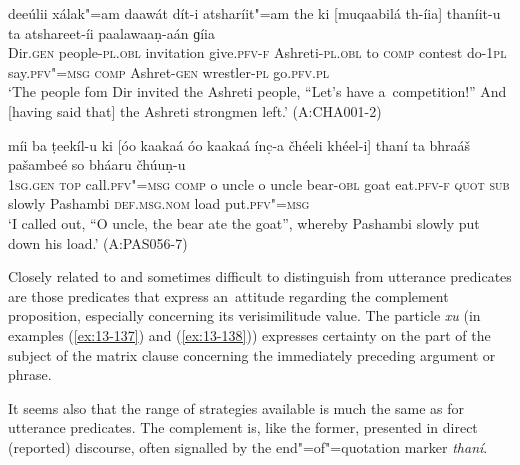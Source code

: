 \begin{exe}
\ex
\label{ex:13-135}
\gll deeúlii xálak"=am daawát dít-i  atsharíit"=am the ki [muqaabilá
  th-íia]  thaníit-u ta atshareet-íi paalawaaṇ-aán ɡíia \\
Dir.\textsc{gen} people-\textsc{pl.obl} invitation give.\textsc{pfv-f}  Ashreti-\textsc{pl.obl} to \textsc{comp} contest do-\textsc{1pl}  say.\textsc{pfv"=msg} \textsc{comp} Ashret-\textsc{gen} wrestler-\textsc{pl} go.\textsc{pfv.pl} \\
\glt `The people fom Dir invited the Ashreti people, ``Let's have a~competition!'' And [having said that] the Ashreti strongmen left.' (A:CHA001-2)

\ex
\label{ex:13-136}
\gll míi ba ṭeekíl-u ki [óo kaakaá óo kaakaá ínc̣-a čhéeli  khéel-i]
thaní ta bhraáš pašambeé so  bháaru čhúuṇ-u \\
\textsc{1sg.gen} \textsc{top} call.\textsc{pfv"=msg} \textsc{comp} o uncle o uncle bear-\textsc{obl} goat  eat.\textsc{pfv-f} \textsc{quot } \textsc{sub} slowly Pashambi \textsc{def.msg.nom} load put.\textsc{pfv"=msg}  \\
\glt `I called out, ``O uncle, the bear ate the goat'', whereby Pashambi slowly put down his load.' (A:PAS056-7) 
\end{exe}

 Closely related to and sometimes difficult to distinguish from utterance predicates are those predicates that express an~attitude regarding the complement proposition, especially concerning its verisimilitude value. The particle \textit{xu} (in examples (\ref{ex:13-137}) and (\ref{ex:13-138})) expresses certainty on the part of the subject of the matrix clause concerning the immediately preceding argument or phrase.


It seems also that the range of strategies available is much the same as for utterance predicates. The complement is, like the former, presented in direct (reported) discourse, often signalled by the end"=of"=quotation marker \textit{thaní}. 

